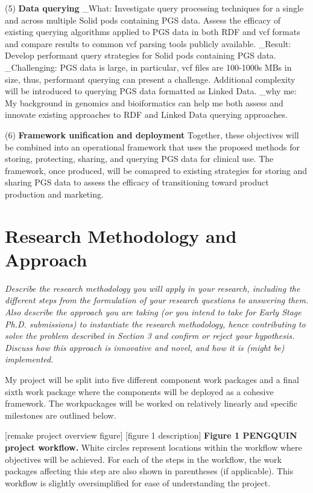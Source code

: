\documentclass{article}
\begin{document}
(5) \textbf{Data querying}
_What: Investigate query processing techniques for a single and across multiple Solid pods containing PGS data. 
Assess the efficacy of existing querying algorithms applied to PGS data in both RDF and vcf formats and compare results to common vcf parsing tools publicly available.
_Result: Develop performant query strategies for Solid pods containing PGS data.
_Challenging: PGS data is large, in particular, vcf files are 100-1000s MBs in size, thus, performant querying can present a challenge. Additional complexity will be introduced to querying PGS data formatted as Linked Data.
_why me: My background in genomics and bioiformatics can help me both assess and innovate existing approaches to RDF and Linked Data querying approaches.



(6) \textbf{Framework unification and deployment}
Together, these objectives will be combined into an operational framework that uses the proposed methods for storing, protecting, sharing, and querying PGS data for clinical use. The framework, once produced, will be comapred to existing strategies for storing and sharing PGS data to assess the efficacy of transitioning toward product production and marketing.



\section{Research Methodology and Approach}
\textit{Describe the research methodology you will apply in your research, including the different steps from the formulation of your research questions to answering them. Also describe the approach you are taking (or you intend to take for Early Stage Ph.D. submissions) to instantiate the research methodology, hence contributing to solve the problem described in Section 3 and confirm or reject your hypothesis. Discuss how this approach is innovative and novel, and how it is (might be) implemented.}

My project will be split into five different component work packages and a final sixth work package where the components will be deployed as a cohesive framework. The workpackages will be worked on relatively linearly and specific milestones are outlined below.

[remake project overview figure]
[figure 1 description]
\textbf{Figure 1 PENGQUIN project workflow.} 
White circles represent locations within the workflow where objectives will be achieved. 
For each of the steps in the workflow, the work packages affecting this step are also shown in parentheses (if applicable). 
This workflow is slightly oversimplified for ease of understanding the project.
\end{document}
